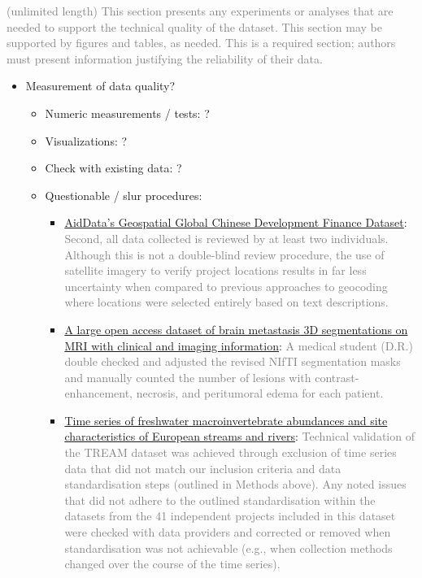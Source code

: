 \documentclass[fleqn,10pt]{wlscirep}
\begin{document}
\textcolor{gray}{(unlimited length) This section presents any experiments or analyses that are needed to support the technical quality of the dataset. This section may be supported by figures and tables, as needed. This is a required section; authors must present information justifying the reliability of their data.}

\begin{itemize}
  \item
  Measurement of data quality?
  
  \begin{itemize}
    \item
    Numeric measurements / tests: ?
    
    \item
    Visualizations: ?
    
    \item
    Check with existing data: ?
    
    \item
    Questionable / slur procedures:
      
      \begin{itemize}
      \item
      \href{https://www.nature.com/articles/s41597-024-03341-w?_gl=1*5ya8g2*_up*MQ..&gclid=EAIaIQobChMInOXO84DVhgMViewWBR3vWQJAEAAYASAAEgJICfD_BwE#Sec28}{AidData’s Geospatial Global Chinese Development Finance Dataset}: \textcolor{gray}{Second, all data collected is reviewed by at least two individuals. Although this is not a double-blind review procedure, the use of satellite imagery to verify project locations results in far less uncertainty when compared to previous approaches to geocoding where locations were selected entirely based on text descriptions.}
      
      \item
      \href{https://www.nature.com/articles/s41597-024-03021-9?_gl=1*1u1zppx*_up*MQ..&gclid=EAIaIQobChMInOXO84DVhgMViewWBR3vWQJAEAAYASAAEgJICfD_BwE#Sec9}{A large open access dataset of brain metastasis 3D segmentations on MRI with clinical and imaging information}: \textcolor{gray}{A medical student (D.R.) double checked and adjusted the revised NIfTI segmentation masks and manually counted the number of lesions with contrast-enhancement, necrosis, and peritumoral edema for each patient.}
      
      \item
      \href{https://www.nature.com/articles/s41597-024-03445-3?_gl=1*1ikco52*_up*MQ..&gclid=EAIaIQobChMInOXO84DVhgMViewWBR3vWQJAEAAYASAAEgJICfD_BwE#Sec11}{Time series of freshwater macroinvertebrate abundances and site characteristics of European streams and rivers}: \textcolor{gray}{Technical validation of the TREAM dataset was achieved through exclusion of time series data that did not match our inclusion criteria and data standardisation steps (outlined in Methods above). Any noted issues that did not adhere to the outlined standardisation within the datasets from the 41 independent projects included in this dataset were checked with data providers and corrected or removed when standardisation was not achievable (e.g., when collection methods changed over the course of the time series).}
      

\end{itemize}
\end{itemize}
\end{itemize}
\end{document}
